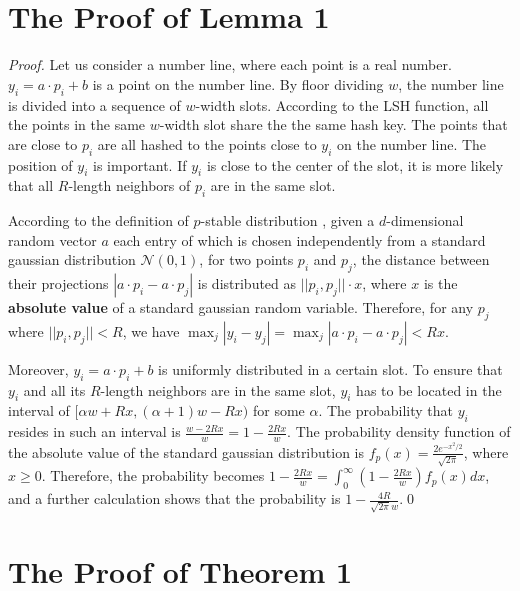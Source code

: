 \appendix

\section{The Proof of Lemma 1}

\begin{proof}

Let us consider a number line, where each point is a real number.
$y_i=a\cdot p_i+b$ is a point on the number line. By floor dividing
$w$, the number line is divided into a sequence of $w$-width slots.
According to the LSH function, all the points in the same $w$-width
slot share the the same hash key.  The points that are close to $p_i$
are all hashed to the points close to $y_i$ on the number line.  The
position of $y_i$ is important.  If $y_i$ is close to the center of
the slot, it is more likely that all $R$-length neighbors of $p_i$
are in the same slot.

According to the definition of $p$-stable distribution
\cite{Datar:2004:LHS:997817.997857}, given a $d$-dimensional random
vector $a$ each entry of which is chosen independently from a standard
gaussian distribution $\mathcal{N}(0,1)$, for two points $p_i$ and
$p_j$, the distance between their projections $|a\cdot p_i-a\cdot
p_j|$ is distributed as $||p_i, p_j||\cdot x$, where $x$ is the \textbf{absolute
value} of a standard gaussian random variable. Therefore, for any
$p_j$ where $||p_i, p_j||<R$, we have $\max_{j}|y_i-y_j|=\max_{j}|a\cdot
p_i-a\cdot p_j|<Rx$.
%

Moreover, $y_i=a\cdot p_i+b$ is uniformly distributed in a certain
slot. To ensure that $y_i$ and all its $R$-length neighbors are in
the same slot, $y_i$ has to be located in the interval of $[\alpha
w+Rx,(\alpha+1)w-Rx)$ for some $\alpha$.   The probability that $y_i$ resides in such an
interval is $\frac{w-2Rx}{w}=1-\frac{2Rx}{w}$.
%
The probability density function of the absolute value of the standard
gaussian distribution is $f_p(x)=\frac{2e^{-x^2/2}}{\sqrt{2\pi}}$,
where $x \geq 0$.  Therefore, the probability becomes
$1-\frac{2Rx}{w}=\int_{0}^{\infty}(1-\frac{2Rx}{w})f_p(x)dx$, and
a further calculation shows that the probability is
$1-\frac{4R}{\sqrt{2\pi}w}$.\qed

\end{proof}


\section{The Proof of Theorem 1}

